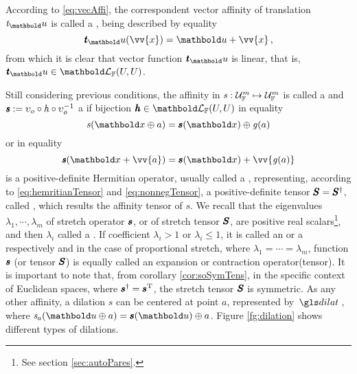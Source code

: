 According to \eqref{eq:vecAffi}, the correspondent vector affinity of translation $\mathit{t}_\vto{u}$ is called a , being described by equality
\begin{equation}\label{eq:transltVec}
\fua{\tnr{\mathit{t}}_\vto{u}}{\vv{x}}=\vto{u} + \vv{x}\,,
\end{equation}
from which it is clear that vector function $\tnr{\mathit{t}}_\vto{u}$ is linear, that is, $\tnr{\mathit{t}}_\vto{u}\in\evl{\cam{F}}{U}{U}$.

Still considering previous conditions, the affinity in $\map{\mathit{s}}{\eamd{U}{F}{m}}{\eamd{U}{F}{m}}$ is called a  and $\tnr{\mathit{s}}:= \upsilon_o\circ\mathit{h}\circ\upsilon_o^{-1}$ a  if bijection $\vtf{h}\in\evl{\cam{F}}{U}{U}$ in equality
\begin{equation}\label{eq:dilat}
\fua{\mathit{s}}{\vto{x}\oplus a}=\fua{\vtf{s}}{\vto{x}}\oplus\fua{\mathit{g}}{a}
\end{equation}
or in equality
\begin{equation}\label{eq:dilatVec}
\fua{\tnr{\mathit{s}}}{\vto{x}+ \vv{a}}=\fua{\vtf{s}}{\vto{x}}+\vv{\fua{\mathit{g}}{a}}
\end{equation}
is a positive-definite Hermitian operator, usually called a , representing, according to \eqref{eq:hemritianTensor} and \eqref{eq:nonnegTensor}, a positive-definite tensor $\tnr{S}=\tnr{S}^\dagger$, called , which results the affinity tensor of $\mathit{s}$. We recall that the eigenvalues $\lambda_1,\cdots,\lambda_m$ of stretch operator $\vtf{s}$, or of stretch tensor $\tnr{S}$, are positive real scalars\footnote{See section \ref{sec:autoPares}.}, and then $\lambda_i$ called a . If coefficient $\lambda_i>1$ or $\lambda_i\leqslant1$, it is called an  or a  respectively and in the case of proportional stretch, where $\lambda_1=\cdots=\lambda_m$, function $\vtf{s}$ (or tensor $\tnr{S}$) is equally called an expansion or contraction operator(tensor). It is important to note that, from corollary \ref{cor:soSymTens}, in the specific context of Euclidean spaces, where $\vtf{s}^\dagger=\vtf{s}^\text{T}$, the stretch tensor $\tnr{S}$ is symmetric. As any other affinity, a dilation $\mathit{s}$ can be centered at point $a$, represented by $\gloref{dilat}$, where $\fua{\mathit{s}_a}{\vto{u}\oplus a}=\fua{\vtf{s}}{\vto{u}}\oplus a$. Figure \ref{fg:dilation} shows different types of dilations.
